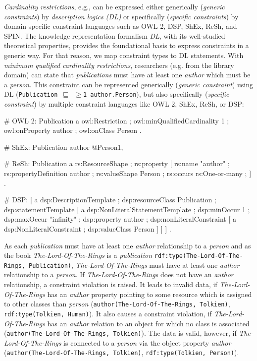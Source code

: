 \documentclass{llncs}
\newcommand{\ms}[1]{\texttt{#1}}
\begin{document}
\emph{Cardinality restrictions}, e.g., can be expressed either generically (\emph{generic constraints}) by \emph{description logics (DL)} 
or specifically (\emph{specific constraints}) by domain-specific constraint languages such as OWL 2, DSP, ShEx, ReSh, and SPIN.
The knowledge representation formalism {\em DL}, with its  well-studied theoretical properties, provides the foundational basis to express constraints in a generic way. 
For that reason, we map constraint types to DL statements.
With \emph{minimum qualified cardinality restrictions}, researchers (e.g. from the library domain) can state
that \emph{publications} must have at least one \emph{author} which must be a \emph{person}.
This constraint can be represented generically (\emph{generic constraint}) using DL (\ms{Publication $\sqsubseteq$ $\geq$1 author.Person}), but also specifically (\emph{specific constraint}) by multiple constraint languages like OWL 2, ShEx, ReSh, or DSP:

\begin{ex}
# OWL 2:
Publication
    a owl:Restriction ;
    owl:minQualifiedCardinality 1 ;
    owl:onProperty author ;
    owl:onClass Person .
		
# ShEx:
Publication { author @Person{1, } }

# ReSh:
Publication a rs:ResourceShape ; rs:property [
    rs:name "author" ; rs:propertyDefinition author ;
    rs:valueShape Person ;
    rs:occurs rs:One-or-many ; ] .
		
# DSP:
[   a dsp:DescriptionTemplate ; 
    dsp:resourceClass Publication ; 
    dsp:statementTemplate [ a dsp:NonLiteralStatementTemplate ;
        dsp:minOccur 1 ; dsp:maxOccur "infinity" ; 
        dsp:property author ; 
        dsp:nonLiteralConstraint [ a dsp:NonLiteralConstraint ;
            dsp:valueClass Person ] ] ] .
\end{ex}

As each \emph{publication} must have at least one \emph{author} relationship to a \emph{person} 
and as the book \emph{The-Lord-Of-The-Rings} is a \emph{publication} \ms{rdf:type(The-Lord-Of-The-Rings, Publication)}, 
\emph{The-Lord-Of-The-Rings} must have at least one \emph{author} relationship to a \emph{person}.
If \emph{The-Lord-Of-The-Rings} does not have an \emph{author} relationship, a constraint violation is raised. 
It leads to invalid data, if \emph{The-Lord-Of-The-Rings} has an \emph{author} property pointing to some resource which is assigned to other classes than \emph{person}
(\ms{author(The-Lord-Of-The-Rings, Tolkien)}, \ms{rdf:type(Tolkien, Human)}).
It also causes a constraint violation, if \emph{The-Lord-Of-The-Rings} has an \emph{author} relation to an object for which no class is associated
(\ms{author(The-Lord-Of-The-Rings, Tolkien)}).
The data is valid, however, if \emph{The-Lord-Of-The-Rings} is connected to a \emph{person} via the object property \emph{author}
(\ms{author(The-Lord-Of-The-Rings, Tolkien)}, \ms{rdf:type(Tolkien, Person)}).
\end{document}
